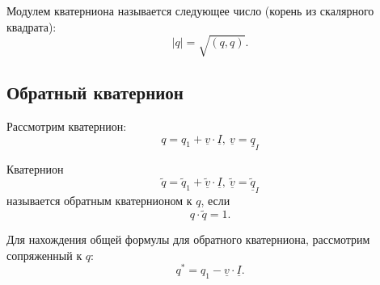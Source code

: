 \documentclass[fleqn]{extarticle}
\newcommand{\abs}[1]{ \left\vert #1 \right\vert }
\newcommand{\pares}[1]{ \left( #1 \right) }
\newcommand{\uv}{\underline{v}}
\newcommand{\uI}{\underline{I}}
\begin{document}
			Модулем кватерниона называется следующее число (корень из скалярного квадрата):
			\[ \abs{q} = \sqrt{\pares{q, q}}. \]

		\subsection{Обратный кватернион}
			Рассмотрим кватернион:
			\[ q = q_1 + \uv \cdot \uI, ~ \uv = \underline{q}_I \]

			Кватернион
			\[ \tilde{q} = \tilde{q}_1 + \tilde{\uv} \cdot \uI, ~ \tilde{\uv} = \underline{\tilde{q}}_I \]
			называется обратным кватернионом к $q$, если
			\[ q \cdot \tilde{q} = 1. \]

			Для нахождения общей формулы для обратного кватерниона, рассмотрим сопряженный к $q$:
			\[ q^{*} = q_1 - \uv \cdot \uI. \]
\end{document}
